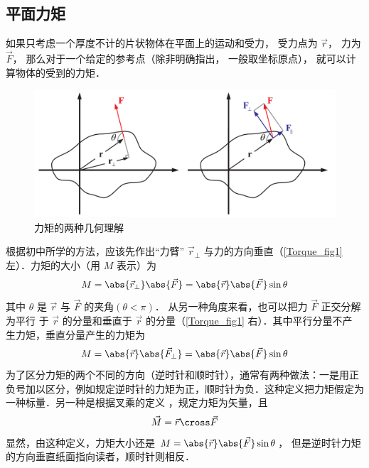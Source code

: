 

\subsection{平面力矩}

如果只考虑一个厚度不计的片状物体在平面上的运动和受力， 受力点为 $\vec r$， 力为 $\vec F$， 那么对于一个给定的参考点（除非明确指出， 一般取坐标原点）， 就可以计算物体的受到的力矩．


\begin{figure}[ht]
\centering
\includegraphics[width=13cm]{./figures/Torque.pdf}
\caption{力矩的两种几何理解}\label{Torque_fig1}
\end{figure}

根据初中所学的方法，应该先作出“力臂” ${\vec r_ \bot }$ 与力的方向垂直（\autoref{Torque_fig1} 左）．力矩的大小（用 $M$ 表示）为
\begin{equation}
M = \abs{{\vec r}_ \bot } \abs{\vec F} = \abs{\vec r} \abs{\vec F} \sin \theta 
\end{equation}
其中 $\theta $ 是 $\vec r$ 与 $\vec F$ 的夹角$(\theta < \pi)$． 
从另一种角度来看，也可以把力 $\vec F$ 正交分解为平行
于 $\vec r$ 的分量和垂直于 $\vec r$ 的分量（\autoref{Torque_fig1} 右）．其中平行分量不产
生力矩，垂直分量产生的力矩为
\begin{equation}
M = \abs{\vec r} \abs{{{\vec F}_ \bot }} = \abs{\vec r} \abs{\vec F} \sin \theta 
\end{equation}
为了区分力矩的两个不同的方向（逆时针和顺时针），通常有两种做法：一是用正负号加以区分，例如规定逆时针的力矩为正，顺时针为负．这种定义把力矩假定为一种标量．另一种是根据叉乘的定义
，规定力矩为矢量，且
\begin{equation}\label{Torque_eq3}
\vec M = \vec r \cross \vec F
\end{equation}
显然，由这种定义，力矩大小还是 $M = \abs{\vec r} \abs{\vec F}\sin \theta $， 但是逆时针力矩的方向垂直纸面指向读者，顺时针则相反．

